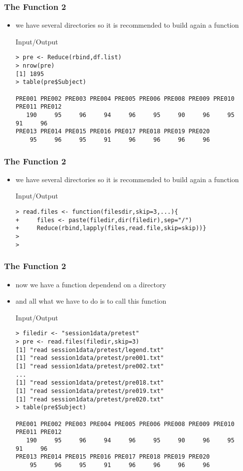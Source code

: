\documentclass[xcolor={table},c]{beamer}
\begin{document}
\begin{frame}[fragile]\frametitle{The Function 2}
  \begin{itemize}
  \item we have several directories so it is recommended to build again a function
    \begin{exampleblock}{Input/Output}\scriptsize
\begin{verbatim}
> pre <- Reduce(rbind,df.list)
> nrow(pre)
[1] 1895
> table(pre$Subject)

PRE001 PRE002 PRE003 PRE004 PRE005 PRE006 PRE008 PRE009 PRE010 PRE011 PRE012 
   190     95     96     94     96     95     90     96     95     91     96 
PRE013 PRE014 PRE015 PRE016 PRE017 PRE018 PRE019 PRE020 
    95     96     95     91     96     96     96     96 
\end{verbatim}
    \end{exampleblock}
  \end{itemize}
\end{frame}



\begin{frame}[fragile]\frametitle{The Function 2}
  \begin{itemize}
  \item we have several directories so it is recommended to build again a function
    \begin{exampleblock}{Input/Output}\small
\begin{verbatim}
> read.files <- function(filesdir,skip=3,...){
+     files <- paste(filedir,dir(filedir),sep="/")
+     Reduce(rbind,lapply(files,read.file,skip=skip))}
>
>
\end{verbatim}
    \end{exampleblock}
  \end{itemize}
\end{frame}


\begin{frame}[fragile]\frametitle{The Function 2}
  \begin{itemize}
  \item now we have a function dependend on a directory
  \item and all what we have to do is to call this function
    \begin{exampleblock}{Input/Output}\scriptsize
\begin{verbatim}
> filedir <- "session1data/pretest"
> pre <- read.files(filedir,skip=3)
[1] "read session1data/pretest/legend.txt"
[1] "read session1data/pretest/pre001.txt"
[1] "read session1data/pretest/pre002.txt"
...
[1] "read session1data/pretest/pre018.txt"
[1] "read session1data/pretest/pre019.txt"
[1] "read session1data/pretest/pre020.txt"
> table(pre$Subject)

PRE001 PRE002 PRE003 PRE004 PRE005 PRE006 PRE008 PRE009 PRE010 PRE011 PRE012 
   190     95     96     94     96     95     90     96     95     91     96 
PRE013 PRE014 PRE015 PRE016 PRE017 PRE018 PRE019 PRE020 
    95     96     95     91     96     96     96     96 
\end{verbatim}
    \end{exampleblock}
  \end{itemize}
\end{frame}

\appendix
\flushlinkimages
\end{document}
